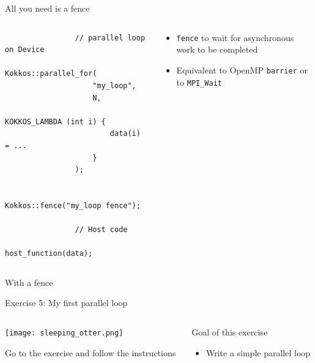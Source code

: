 \documentclass[aspectratio=169]{beamer}
\begin{document}
\begin{frame}[fragile]{All you need is a fence}
    \begin{columns}
        \begin{column}{0.5\linewidth}
            \begin{verbatim}
                // parallel loop on Device
                Kokkos::parallel_for(
                    "my_loop",
                    N,
                    KOKKOS_LAMBDA (int i) {
                        data(i) = ...
                    }
                );

                Kokkos::fence("my_loop fence");

                // Host code
                host_function(data);
            \end{verbatim}
        \end{column}
        \begin{column}{0.5\linewidth}
            \begin{itemize}
                \item \texttt{fence} to wait for asynchronous work to be completed
                \item Equivalent to OpenMP \texttt{barrier} or to \texttt{MPI\_Wait}
            \end{itemize}
        \end{column}
    \end{columns}

    \vspace{1em}
     With a fence
\end{frame}


\begin{exerciseframe}{Exercise 5: My first parallel loop}
    \begin{columns}
        \begin{column}{0.5\linewidth}
            \begin{center}
                \texttt{[image: sleeping\_otter.png]}
            \end{center}

            Go to the exercise  and follow the instructions
        \end{column}
        \begin{column}{0.5\linewidth}
            \begin{block}{Goal of this exercise}
                \begin{itemize}
                    \item Write a simple parallel loop
                \end{itemize}
            \end{block}
        \end{column}
    \end{columns}
\end{exerciseframe}
\end{document}
